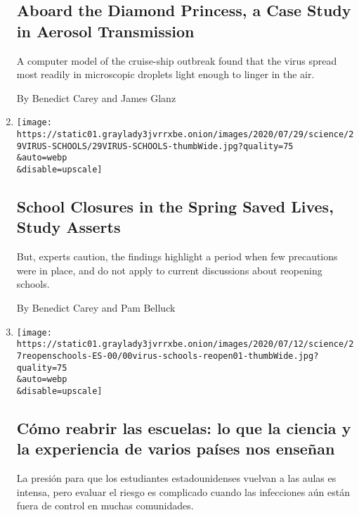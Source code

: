 \begin{enumerate}
{  \subsection{Aboard the Diamond Princess, a Case Study in Aerosol
  Transmission}\label{aboard-the-diamond-princess-a-case-study-in-aerosol-transmission}}

  A computer model of the cruise-ship outbreak found that the virus
  spread most readily in microscopic droplets light enough to linger in
  the air.

  By Benedict Carey and James Glanz
\item
  \href{/2020/07/29/health/covid-school-reopening.html}{}

  \texttt{[image: https://static01.graylady3jvrrxbe.onion/images/2020/07/29/science/29VIRUS-SCHOOLS/29VIRUS-SCHOOLS-thumbWide.jpg?quality=75\\\&auto=webp\\\&disable=upscale]}

  \hypertarget{school-closures-in-the-spring-saved-lives-study-asserts}{%
  \subsection{School Closures in the Spring Saved Lives, Study
  Asserts}\label{school-closures-in-the-spring-saved-lives-study-asserts}}

  But, experts caution, the findings highlight a period when few
  precautions were in place, and do not apply to current discussions
  about reopening schools.

  By Benedict Carey and Pam Belluck
\item
  \href{/es/2020/07/27/espanol/ciencia-y-tecnologia/regreso-a-clases-coronavirus.html}{}

  \texttt{[image: https://static01.graylady3jvrrxbe.onion/images/2020/07/12/science/27reopenschools-ES-00/00virus-schools-reopen01-thumbWide.jpg?quality=75\\\&auto=webp\\\&disable=upscale]}

  \hypertarget{cuxf3mo-reabrir-las-escuelas-lo-que-la-ciencia-y-la-experiencia-de-varios-pauxedses-nos-enseuxf1an}{%
  \subsection{Cómo reabrir las escuelas: lo que la ciencia y la
  experiencia de varios países nos
  enseñan}\label{cuxf3mo-reabrir-las-escuelas-lo-que-la-ciencia-y-la-experiencia-de-varios-pauxedses-nos-enseuxf1an}}

  La presión para que los estudiantes estadounidenses vuelvan a las
  aulas es intensa, pero evaluar el riesgo es complicado cuando las
  infecciones aún están fuera de control en muchas comunidades.


\end{enumerate}
